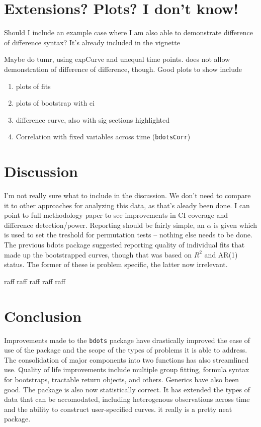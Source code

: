 \documentclass{article}
\begin{document}
\section{Extensions? Plots? I don't know!}

Should I include an example case where I am also able to demonstrate difference of difference syntax? It's already included in the vignette

Maybe do tumr, using expCurve and unequal time points. does not allow demonstration of difference of difference, though. Good plots to show include

\begin{enumerate}
\item plots of fits
\item plots of bootstrap with ci
\item difference curve, also with sig sections highlighted
\item Correlation with fixed variables across time (\texttt{bdotsCorr})
\end{enumerate}

\section{Discussion}
I'm not really sure what to include in the discussion. We don't need to compare it to other approaches for analyzing this data, as that's aleady been done. I can point to full methodology paper to see improvements in CI coverage and difference detection/power. Reporting should be fairly simple, an $\alpha$ is given which is used to set the treshold for permutation tests -- nothing else needs to be done. The previous bdots package suggested reporting quality of individual fits that made up the bootstrapped curves, though that was based on $R^2$ and AR(1) status. The former of these is problem specific, the latter now irrelevant.

raff raff raff raff raff




\section{Conclusion}

Improvements made to the \texttt{bdots} package have drastically improved the ease of use of the package and the scope of the types of  problems it is able to address. The consolidation of major components into two functions has also streamlined use. Quality of life improvements include multiple group fitting, formula syntax for bootstraps, tractable return objects, and others. Generics have also been good. The package is also now statistically correct. It has extended the types of data that can be accomodated, including heterogenous observations across time and the ability to construct user-specified curves. it really is a pretty neat package.
\end{document}
